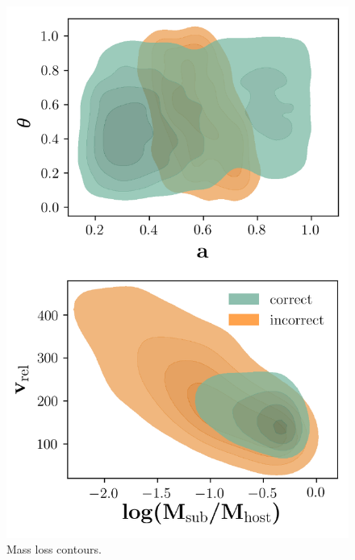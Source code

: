 \documentclass[fleqn,usenatbib]{mnras}
\begin{document}
\begin{figure}
	\includegraphics[width=\textwidth]{Figures/survival_contours}
    \caption{Mass loss contours.}
    \label{fig:survival_contours}
\end{figure}
\end{document}
